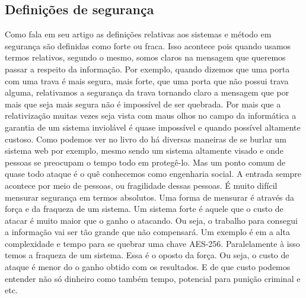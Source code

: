 \subsection{Defini\c{c}\~oes de seguran\c{c}a}
\label{subsection:definicoes_seguranca}
Como \cite{o2003comparing} fala em seu artigo as defini\c{c}\~oes relativas aos sistemas e m\'etodo em seguran\c{c}a s\~ao definidas como forte ou fraca. Isso acontece pois quando usamos termos relativos, segundo o mesmo, somos claros na mensagem que queremos passar a respeito da informa\c{c}\~ao. Por exemplo, quando dizemos que uma porta com uma trava \'e mais segura, mais forte, que uma porta que n\~ao possui trava alguma, relativamos a seguran\c{c}a da trava tornando claro a mensagem que por mais que seja mais segura n\~ao \'e imposs\'ivel de ser quebrada.
\newline
Por mais que a relativiza\c{c}\~ao muitas vezes seja vista com maus olhos no campo da inform\'atica a garantia de um sistema inviol\'avel \'e quase imposs\'ivel e quando poss\'ivel altamente custoso. 
\newline
Como podemos ver no livro do \cite{stuttard2011web} h\'a diversas maneiras de se burlar um sistema web por exemplo, mesmo sendo um sistema altamente visado e onde pessoas se preocupam o tempo todo em proteg\^e-lo. Mas um ponto comum de quase todo ataque \'e o qu\^e conhecemos como engenharia social. A entrada sempre acontece por meio de pessoas, ou fragilidade dessas pessoas.
\newline
\'E muito dif\'icil mensurar seguran\c{c}a em termos absolutos. Uma forma de mensurar \'e atrav\'es da for\c{c}a e da fraqueza de um sistema. Um sistema forte \'e aquele que o custo de atacar \'e muito maior que o ganho o atacando. Ou seja, o trabalho para consegui a informa\c{c}\~ao vai ser t\~ao grande que n\~ao compensar\'a. Um exemplo \'e em \cite{biryukov2010key} a alta complexidade e tempo para se quebrar uma chave AES-256.
\newline
Paralelamente \`a isso temos a fraqueza de um sistema. Essa \'e o oposto da for\c{c}a. Ou seja, o custo de ataque \'e menor do o ganho obtido com os resultados. E de que custo podemos entender n\~ao s\'o dinheiro como tamb\'em tempo, potencial para puni\c{c}\~ao criminal e etc.